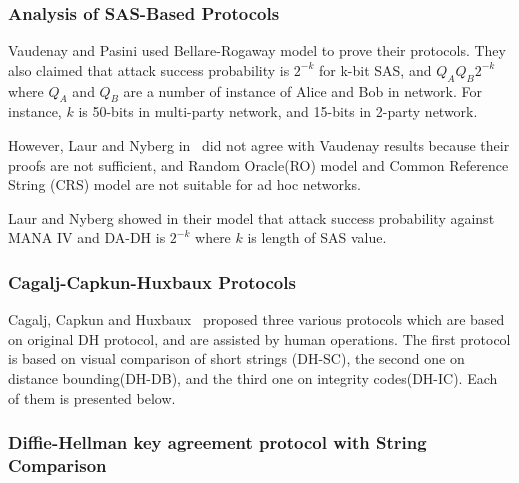 \subsubsection*{Analysis of SAS-Based Protocols}

Vaudenay and Pasini used Bellare-Rogaway model to prove their protocols. They also claimed that attack success probability is $2^{-k}$ for k-bit SAS, and $Q_A Q_B 2^{-k}$ where $Q_A$ and $Q_B$ are a number of instance of Alice and Bob in network. For instance, $k$ is 50-bits in multi-party network, and 15-bits in 2-party network.

However, Laur and Nyberg in~\cite{Laur:2006kl} did not agree with Vaudenay results because their proofs are not sufficient, and Random Oracle(RO) model and Common Reference String (CRS) model are not suitable for ad hoc networks.

Laur and Nyberg showed in their model that attack success probability against MANA IV and DA-DH is $2^ {-k}$ where $k$ is length of SAS value.

\subsubsection{Cagalj-Capkun-Huxbaux Protocols}

Cagalj, Capkun and Huxbaux~\cite{1580514} proposed three various protocols which are based on original DH protocol, and are assisted by human operations. The first protocol is based on visual comparison of short strings (DH-SC), the second one on distance bounding(DH-DB), and the third one on integrity codes(DH-IC). Each of them is presented below. 
 
\subsubsection*{Diffie-Hellman key agreement protocol with String Comparison}

